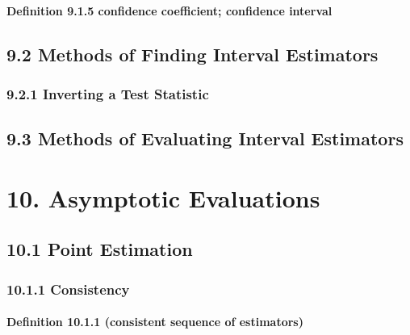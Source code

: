 \documentclass[6pt,Portrait]{article}
\let\oldparagraph\paragraph
\renewcommand{\paragraph}[1]{\oldparagraph{#1}\mbox{}}
\begin{document}
\hypertarget{CI}{%
\paragraph{\texorpdfstring{\textbf{Definition 9.1.5 confidence
coefficient; confidence
interval}}{Definition 9.1.5 confidence coefficient; confidence interval}}\label{CI}}

\hypertarget{methods-of-finding-interval-estimators}{%
\subsection{9.2 Methods of Finding Interval
Estimators}\label{methods-of-finding-interval-estimators}}

\hypertarget{inverting-a-test-statistic}{%
\subsubsection{9.2.1 Inverting a Test
Statistic}\label{inverting-a-test-statistic}}

\hypertarget{methods-of-evaluating-interval-estimators}{%
\subsection{9.3 Methods of Evaluating Interval
Estimators}\label{methods-of-evaluating-interval-estimators}}

\hypertarget{asymptotic-evaluations}{%
\section{10. Asymptotic Evaluations}\label{asymptotic-evaluations}}

\hypertarget{point-estimation-1}{%
\subsection{10.1 Point Estimation}\label{point-estimation-1}}

\hypertarget{consistency}{%
\subsubsection{10.1.1 Consistency}\label{consistency}}

\hypertarget{consi-Seq-E}{%
\paragraph{\texorpdfstring{\textbf{Definition 10.1.1 (consistent
sequence of
estimators)}}{Definition 10.1.1 (consistent sequence of estimators)}}\label{consi-Seq-E}}
\end{document}
